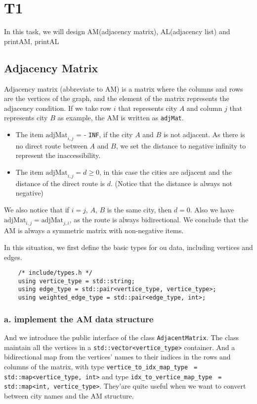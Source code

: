\section{T1}

In this task, we will design AM(adjacency matrix), AL(adjacency list) and printAM, printAL

\subsection{Adjacency Matrix}
Adjacency matrix (abbreviate to AM) is a matrix where the columns and rows are the vertices of the graph, and the element of the matrix represents the adjacency condition. If we take row $i$ that represents city $A$ and column $j$ that represents city $B$ as example, the AM is written as \verb|adjMat|.
\begin{itemize}
    \item The item $\text{adjMat}_{i, j}$ =  - \verb|INF|, if the city $A$ and $B$ is not adjacent. As there is no direct route between $A$ and $B$, we set the distance to negative infinity to represent the inaccessibility.
    \item The item $\text{adjMat}_{i, j} = d \geq 0$, in this case the cities are adjacent and the distance of the direct route is $d$. (Notice that the distance is always not negative)
\end{itemize}
We also notice that if $i=j$, $A$, $B$ is the same city, then $d = 0$. Also we have $\text{adjMat}_{i, j} = \text{adjMat}_{j, i}$, as the route is always bidirectional. We conclude that the AM is always a symmetric matrix with non-negative items.

In this situation, we first define the basic types for ou data, including vertices and edges.

\begin{verbatim}
    /* include/types.h */
    using vertice_type = std::string;
    using edge_type = std::pair<vertice_type, vertice_type>;
    using weighted_edge_type = std::pair<edge_type, int>;
\end{verbatim}

\subsubsection*{a. implement the \textbf{AM} data structure}
And we introduce the public interface of the class \verb|AdjacentMatrix|. The class maintain all the vertices in a \texttt{std::vector<vertice_type>} container. And a bidirectional map from the vertices' names to their indices in the rows and columns of the matrix, with type \texttt{vertice_to_idx_map_type} \newline \texttt{ = std::map<vertice_type, int>} and type \texttt{idx_to_vertice_map_type} \newline \texttt{ = std::map<int, vertice_type>}. They'are quite useful when we want to convert between city names and the AM structure.


